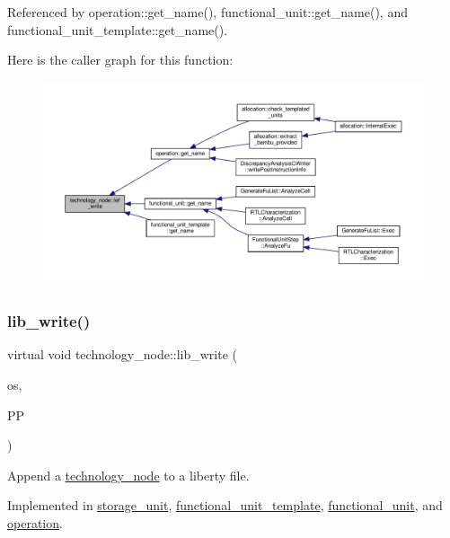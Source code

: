 Referenced by operation\+::get\+\_\+name(), functional\+\_\+unit\+::get\+\_\+name(), and functional\+\_\+unit\+\_\+template\+::get\+\_\+name().

Here is the caller graph for this function\+:
\nopagebreak
\begin{figure}[H]
\begin{center}
\leavevmode
\includegraphics[width=350pt]{df/d06/structtechnology__node_a2a92a701dec7c32a6bee6f66576f1fc6_icgraph}
\end{center}
\end{figure}
\mbox{\label{structtechnology__node_a7e56b3bd8c693bb664fae9e5538b2526}} 
\subsubsection{\texorpdfstring{lib\+\_\+write()}{lib\_write()}}
{\footnotesize\ttfamily virtual void technology\+\_\+node\+::lib\+\_\+write (\begin{DoxyParamCaption}\item[{std\+::ofstream \&}]{os,  }\item[{const \hyperlink{simple__indent_8hpp_ad85cff64e49d5dbf5cefe96f411c720e}{simple\+\_\+indent\+Ref}}]{PP }\end{DoxyParamCaption})\hspace{0.3cm}{\ttfamily [pure virtual]}}



Append a \hyperlink{structtechnology__node}{technology\+\_\+node} to a liberty file. 



Implemented in \hyperlink{structstorage__unit_ad2c076de79995410b591bf3102c47cc1}{storage\+\_\+unit}, \hyperlink{structfunctional__unit__template_a1b4e1554138137039ed3048a042e5543}{functional\+\_\+unit\+\_\+template}, \hyperlink{structfunctional__unit_aded00fb1bbe01e59c625772678b61f01}{functional\+\_\+unit}, and \hyperlink{structoperation_a862e63d21faf48219bfcf1650471da2a}{operation}.



